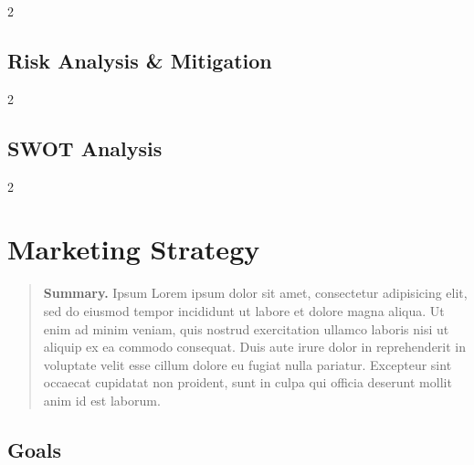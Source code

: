\documentclass[9pt,]{book}
\begin{document}
\begin {multicols}{2}

\lipsum

\end {multicols}

\hypertarget{risk-analysis-mitigation}{%
\section{Risk Analysis \& Mitigation}\label{risk-analysis-mitigation}}

\begin {multicols}{2}

\lipsum

\end {multicols}

\hypertarget{swot-analysis}{%
\section{SWOT Analysis}\label{swot-analysis}}

\begin {multicols}{2}

\lipsum

\end {multicols}

\hypertarget{marketing-strategy}{%
\chapter{Marketing Strategy}\label{marketing-strategy}}

\begin{quote}
\textbf{Summary.} Ipsum Lorem ipsum dolor sit amet, consectetur
adipisicing elit, sed do eiusmod tempor incididunt ut labore et dolore
magna aliqua. Ut enim ad minim veniam, quis nostrud exercitation ullamco
laboris nisi ut aliquip ex ea commodo consequat. Duis aute irure dolor
in reprehenderit in voluptate velit esse cillum dolore eu fugiat nulla
pariatur. Excepteur sint occaecat cupidatat non proident, sunt in culpa
qui officia deserunt mollit anim id est laborum.
\end{quote}

\hypertarget{goals}{%
\section{Goals}\label{goals}}
\end{document}
